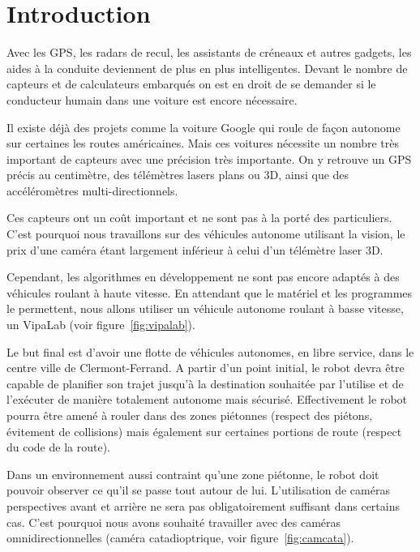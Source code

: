 \section{Introduction}

Avec les GPS, les radars de recul, les assistants de créneaux et autres gadgets, les aides à la conduite deviennent de plus en plus intelligentes.
Devant le nombre de capteurs et de calculateurs embarqués on est en droit de se demander si le conducteur humain dans une voiture est encore nécessaire.

Il existe déjà des projets comme la voiture Google qui roule de façon autonome sur certaines les routes américaines. Mais ces voitures nécessite un nombre très important de capteurs avec une précision très importante.
On y retrouve un GPS précis au centimètre, des télémètres lasers plans ou 3D, ainsi que des accéléromètres multi-directionnels.

Ces capteurs ont un coût important et ne sont pas à la porté des particuliers.
C'est pourquoi nous travaillons sur des véhicules autonome utilisant la vision, le prix d'une caméra étant largement inférieur à celui d'un télémètre laser 3D.

Cependant, les algorithmes en développement ne sont pas encore adaptés à des véhicules roulant à haute vitesse.
En attendant que le matériel et les programmes le permettent, nous allons utiliser un véhicule autonome roulant à basse vitesse, un VipaLab (voir figure~\ref{fig:vipalab}).


Le but final est d'avoir une flotte de véhicules autonomes, en libre service, dans le centre ville de Clermont-Ferrand.
A partir d'un point initial, le robot devra être capable de planifier son trajet jusqu'à la destination souhaitée par l'utilise et de l'exécuter de manière totalement autonome mais sécurisé.
Effectivement le robot pourra être amené à rouler dans des zones piétonnes (respect des piétons, évitement de collisions) mais également sur certaines portions de route (respect du code de la route).

Dans un environnement aussi contraint qu'une zone piétonne, le robot doit pouvoir observer ce qu'il se passe tout autour de lui.
L'utilisation de caméras perspectives avant et arrière ne sera pas obligatoirement suffisant dans certains cas.
C'est pourquoi nous avons souhaité travailler avec des caméras omnidirectionnelles (caméra catadioptrique, voir figure~\ref{fig:camcata}).

